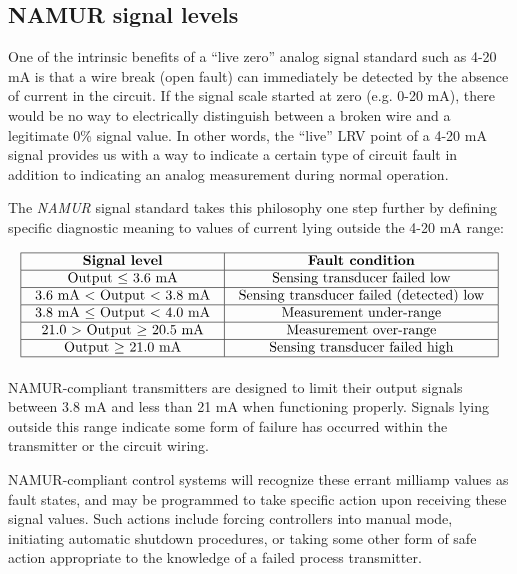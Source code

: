\filbreak
\subsection{NAMUR signal levels}

One of the intrinsic benefits of a ``live zero'' analog signal standard such as 4-20 mA is that a wire break (open fault) can immediately be detected by the absence of current in the circuit.  If the signal scale started at zero (e.g. 0-20 mA), there would be no way to electrically distinguish between a broken wire and a legitimate 0\% signal value.  In other words, the ``live'' LRV point of a 4-20 mA signal provides us with a way to indicate a certain type of circuit fault in addition to indicating an analog measurement during normal operation.

The \textit{NAMUR} signal standard takes this philosophy one step further by defining specific diagnostic meaning to values of current lying outside the 4-20 mA range:  \label{NAMUR_signal_levels}


$$\vbox{\offinterlineskip
\halign{\strut
\vrule \quad\hfil # \ \hfil & 
\vrule \quad\hfil # \ \hfil \vrule \cr
\noalign{\hrule}
%
\textbf{Signal level} & \textbf{Fault condition} \cr
%
\noalign{\hrule}
%
Output $\leq$ 3.6 mA & Sensing transducer failed low \cr
%
\noalign{\hrule}
%
3.6 mA $<$ Output $<$ 3.8 mA & Sensing transducer failed (detected) low \cr
%
\noalign{\hrule}
%
3.8 mA $\leq$ Output $<$ 4.0 mA & Measurement under-range \cr
%
\noalign{\hrule}
%
21.0 $>$ Output $\geq$ 20.5 mA & Measurement over-range \cr
%
\noalign{\hrule}
%
Output $\geq$ 21.0 mA & Sensing transducer failed high \cr
%
\noalign{\hrule}
} %
}$$ %

NAMUR-compliant transmitters are designed to limit their output signals between 3.8 mA and less than 21 mA when functioning properly.  Signals lying outside this range indicate some form of failure has occurred within the transmitter or the circuit wiring.

NAMUR-compliant control systems will recognize these errant milliamp values as fault states, and may be programmed to take specific action upon receiving these signal values.  Such actions include forcing controllers into manual mode, initiating automatic shutdown procedures, or taking some other form of safe action appropriate to the knowledge of a failed process transmitter.








